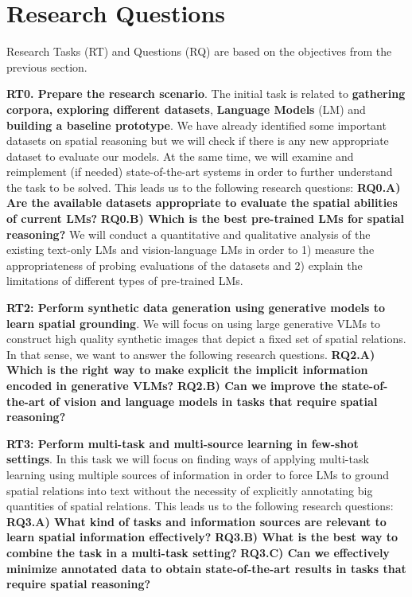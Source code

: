 \section{Research Questions}

Research Tasks (RT) and Questions (RQ) are based on the objectives from the previous section.

\textbf{RT0. Prepare the research scenario}. The initial task is related to \textbf{gathering corpora, exploring different datasets}, \textbf{Language Models} (LM) and \textbf{building a baseline prototype}. We have already identified some important datasets on spatial reasoning but we will check if there is any new appropriate dataset to evaluate our models. At the same time, we will examine and reimplement (if needed) state-of-the-art systems in order to further understand the task to be solved. This leads us to the following research questions: \textbf{RQ0.A) Are the available datasets appropriate to evaluate the spatial abilities of current LMs?} \textbf{RQ0.B) Which is the best pre-trained LMs for spatial reasoning?} We will conduct a quantitative and qualitative analysis of the existing text-only LMs and vision-language LMs in order to 1) measure the appropriateness of probing evaluations of the datasets and 2) explain the limitations of different types of pre-trained LMs.

\textbf{RT2: Perform synthetic data generation using generative models to learn spatial grounding}. We will focus on using large generative VLMs to construct high quality synthetic images that depict a fixed set of spatial relations. In that sense, we want to answer the following research questions. \textbf{RQ2.A) Which is the right way to make explicit the implicit information encoded in generative VLMs?} \textbf{RQ2.B) Can we improve the state-of-the-art of vision and language models in tasks that require spatial reasoning?}

\textbf{RT3: Perform multi-task and multi-source learning in few-shot settings}. In this task we will focus on finding ways of applying multi-task learning using multiple sources of information in order to force LMs to ground spatial relations into text without the necessity of explicitly annotating big quantities of spatial relations. This leads us to the following research questions: \textbf{RQ3.A) What kind of tasks and information sources are relevant to learn spatial information effectively?} \textbf{RQ3.B) What is the best way to combine the task in a multi-task setting?} \textbf{RQ3.C) Can we effectively minimize annotated data to obtain state-of-the-art results in tasks that require spatial reasoning?}